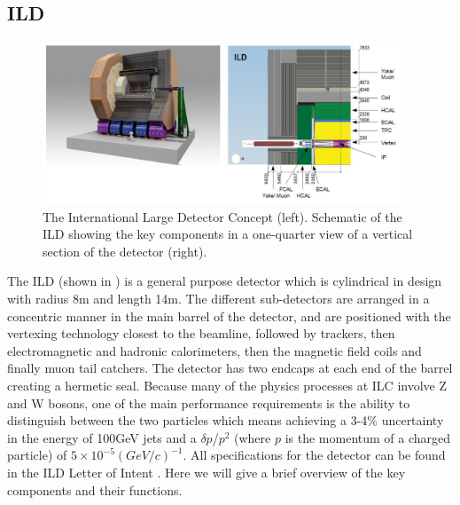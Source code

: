 \subsection{ILD}
\begin{figure}
  \centering
  \includegraphics[width=0.95\textwidth,keepaspectratio]{Experiments/fig/ILD}
  \caption[ILD Detector]{The International Large Detector Concept (left). Schematic of the ILD showing the key components in a one-quarter view of a vertical section of the detector (right). \cite{ILCTDR}}
  \label{Fig:ILD}
\end{figure}
The ILD (shown in ) is a general purpose detector which is cylindrical in design with radius 8m and length 14m. The different sub-detectors are arranged in a concentric manner in the main barrel of the detector, and are positioned with the vertexing technology closest to the beamline, followed by trackers, then electromagnetic and hadronic calorimeters, then the magnetic field coils and finally muon tail catchers. The detector has two endcaps at each end of the barrel creating a hermetic seal. Because many of the physics processes at \ac{ILC} involve Z and W bosons, one of the main performance requirements is the ability to distinguish between the two particles which means achieving a 3-4\% uncertainty in the energy of 100GeV jets and a ${\delta p}$/${p^2}$ (where $p$ is the momentum of a charged particle) of ${5\times10^{-5} (GeV/c)^{-1}}$. All specifications for the detector can be found in the \ac{ILD} Letter of Intent \cite{ILD}. Here we will give a brief overview of the key components and their functions.

